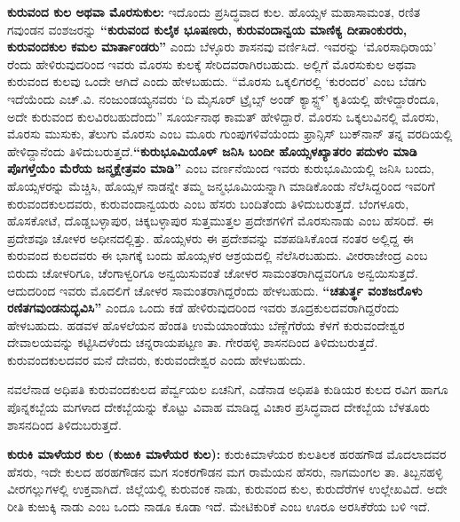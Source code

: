 \textbf{ಕುರುವಂದ ಕುಲ ಅಥವಾ ಮೊರಸುಕುಲ:} ಇದೊಂದು ಪ್ರಸಿದ್ಧವಾದ ಕುಲ. ಹೊಯ್ಸಳ ಮಹಾಸಾಮಂತ, ರಣಿತ ಗವುಂಡನ ವಂಶಜರನ್ನು \textbf{“ಕುರುವಂದ ಕುಲೈಕ ಭೂಷಣರು, ಕುರುವಂದಾನ್ವಯ ಮಾಣಿಕ್ಯ ದೀಪಾಂಕುರರು, ಕುರುವಂದಕುಲ ಕಮಲ ಮಾರ್ತಾಂಡರು”} ಎಂದು ಬೆಳ್ಳೂರು ಶಾಸನವು ವರ್ಣಿಸಿದೆ. ಇವರನ್ನು ‘ಮೊರಸಾಧಿರಾಯ’ ರೆಂದು ಹೇಳಿರುವುದರಿಂದ ಇವರು ಮೊರಸು ಕುಲಕ್ಕೆ ಸೇರಿದವರಾಗಿರಬಹುದು. ಅಲ್ಲಿಗೆ ಮೊರಸುಕುಲ ಅಥವಾ ಕುರುವಂದ ಕುಲವು ಒಂದೇ ಆಗಿದೆ ಎಂದು ಹೇಳಬಹುದು. “ಮೊರಸು ಒಕ್ಕಲಿಗರಲ್ಲಿ ‘ಕುರಂದರ’ ಎಂಬ ಬೆಡಗು ಇದೆಯೆಂದು ಎಚ್​.ವಿ. ನಂಜುಂಡಯ್ಯನವರು ‘ದಿ ಮೈಸೂರ್​ ಟ್ರೈಬ್ಸ್​ ಅಂಡ್​ ಕ್ಯಾಸ್ಟ್ಸ್’ ಕೃತಿಯಲ್ಲಿ ಹೇಳಿದ್ದಾರೆಂದೂ, ಅದೇ ಕುರುವಂದ ಕುಲವಿರಬಹುದೆಂದು” ಸೂರ್ಯನಾಥ ಕಾಮತ್​ ಹೇಳಿದ್ದಾರೆ. ಮೊರಸು ಒಕ್ಕಲುವಿನಲ್ಲಿ ಮೊರಸು, ಮೊರಸು ಮುಸುಕು, ತೆಲುಗು ಮೊರಸು ಎಂಬ ಮೂರು ಗುಂಪುಗಳಿವೆಯೆಂದು ಫ್ರಾನ್ಸಿಸ್​ ಬುಕ್​ನಾನ್​ ತನ್ನ ವರದಿಯಲ್ಲಿ ಹೇಳಿದ್ದಾನೆಂದು ತಿಳಿದುಬರುತ್ತದೆ.\textbf{“ಕುರುಭೂಮಿಯೊಳ್​ ಜನಿಸಿ ಬಂದೀ ಹೊಯ್ಸಳಖ್ಯಾತರಂ ಪದುಳಂ ಮಾಡಿ ಪೊಗಳ್ತೆಯೆಂ ಮೆರೆಯ ಜನ್ಮಕ್ಷೇತ್ರವಂ ಮಾಡಿ”} ಎಂಬ ವರ್ಣನೆಯಿಂದ ಇವರು ಕುರುಭೂಮಿಯಲ್ಲಿ ಜನಿಸಿ ಬಂದು, ಹೊಯ್ಸಳರನ್ನು ಮೆಚ್ಚಿಸಿ, ಹೊಯ್ಸಳ ನಾಡನ್ನೇ ತಮ್ಮ ಜನ್ಮಭೂಮಿಯನ್ನಾಗಿ ಮಾಡಿಕೊಂಡು ನೆಲೆಸಿದ್ದರಿಂದ ಇವರಿಗೆ ಕುರುವಂದಕುಲದವರು, ಕುರುವಂದಾನ್ವಯರು ಎಂಬ ಹೆಸರು ಬಂದಿತೆಂದು ತಿಳಿದುಬರುತ್ತದೆ. ಬೆಂಗಳೂರು, ಹೊಸಕೋಟೆ, ದೊಡ್ಡಬಳ್ಳಾಪುರ, ಚಿಕ್ಕಬಳ್ಳಾಪುರ ಸುತ್ತಮುತ್ತಲ ಪ್ರದೇಶಗಳಿಗೆ ಮೊರಸುನಾಡು ಎಂಬ ಹೆಸರಿದೆ. ಈ ಪ್ರದೇಶವೂ ಚೋಳರ ಅಧೀನದಲ್ಲಿತ್ತು. ಹೊಯ್ಸಳರು ಈ ಪ್ರದೇಶವನ್ನು ವಶಪಡಿಸಿಕೊಂಡ ನಂತರ ಅಲ್ಲಿದ್ದ ಈ ಕುರುವಂದ ಕುಲದವರು ಈ ಭಾಗಕ್ಕೆ ಬಂದು ಹೊಯ್ಸಳರ ಆಶ್ರಯದಲ್ಲಿ ನೆಲೆಸಿರಬಹುದು. ವೀರರಾಜೇಂದ್ರ ಎಂಬ ಬಿರುದು ಚೋಳರಿಗೂ, ಚೆಂಗಾಳ್ವರಿಗೂ ಅನ್ವಯಿಸುವಂತೆ ಚೋಳರ ಸಾಮಂತರಾಗಿದ್ದವರಿಗೂ ಅನ್ವಯಿಸುತ್ತದೆ. ಆದುದರಿಂದ ಇವರು ಮೊದಲಿಗೆ ಚೋಳರ ಸಾಮಂತರಾಗಿದ್ದರೆಂದು ಹೇಳಬಹುದು. \textbf{“ಚತುರ್ತ್ಥ ವಂಶಜರೊಳು ರಣಿತಗವುಂಡನುದ್ಭವಿಸಿ”} ಎಂದೂ ಒಂದು ಕಡೆ ಹೇಳಿರುವುದರಿಂದ ಇವರು ಶೂದ್ರಕುಲದವರಾಗಿದ್ದರೆಂದು ಹೇಳಬಹುದು. ಹಡವಳ ಹೊಳಲೆಯನ ಹೆಂಡತಿ ಉಮೆಯಾಂಡೆಯು ಬೆಣ್ಣೆಗೆರೆಯ ಕೆಳಗೆ ಕುರುವಂದೇಶ್ವರ ದೇವಾಲಯವನ್ನು ಕಟ್ಟಿಸಿದಳೆಂದು ಚನ್ನರಾಯಪಟ್ಟಣ ತಾ. ಗೇರಹಳ್ಳಿ ಶಾಸನದಿಂದ ತಿಳಿದುಬರುತ್ತದೆ. ಕುರುವಂದಕುಲದವರ ಮನೆ ದೇವರು, ಕುರುವಂದೇಶ್ವರ ಎಂದು ಹೇಳಬಹುದು.

\vskip 3pt

ನವಲೆನಾಡ ಅಧಿಪತಿ ಕುರುವಂದಕುಲದ ಪೆರ್ವ್ವಯಲ ಏಚನಿಗೆ, ಎಡೆನಾಡ ಅಧಿಪತಿ ಕುಡಿಯರ ಕುಲದ ರವಿಗ ಹಾಗೂ ಪೊನ್ನಕಬ್ಬೆಯ ಮಗಳಾದ ದೇಕಬ್ಬೆಯನ್ನು ಕೊಟ್ಟು ವಿವಾಹ ಮಾಡಿದ್ದ ವಿಚಾರ ಪ್ರಸಿದ್ಧವಾದ ದೇಕಬ್ಬೆಯ ಬೆಳತೂರು ಶಾಸನದಿಂದ ತಿಳಿದುಬರುತ್ತದೆ.

\vskip 3pt

\textbf{ಕುರುಕಿ ಮಾಳೆಯರ ಕುಲ (ಕುಱುಕಿ ಮಾಳೆಯರ ಕುಲ):} ಕುರುಕಿಮಾಳೆಯರ ಕುಲತಿಲಕ ಹರಹಗೌಡ ಮೊದಲಾದವರ ಹೆಸರು, ಇದೇ ಕುಲದ ಹರಹಗೌಡನ ಮಗ ಸಂಕರಗೌಡನ ಮಗ ರಾಮೆಯನ ಹೆಸರು, ನಾಗಮಂಗಲ ತಾ. ತಿಬ್ಬನಹಳ್ಳಿ ವೀರಗಲ್ಲುಗಳಲ್ಲಿ ಉಕ್ತವಾಗಿದೆ. ಜಿಲ್ಲೆಯಲ್ಲಿ ಕುರುವಂಕ ನಾಡು, ಕುರುವಂದ ಕುಲ, ಕುರುದೆರೆಗಳ ಉಲ್ಲೇಖವಿದೆ. ಅದೇ ರೀತಿ ಕುಱುಕ್ಕಿ ನಾಡು ಎಂಬ ಒಂದು ನಾಡೂ ಕೂಡಾ ಇದೆ. ಮೇಟಿಕುರಿಕೆ ಎಂಬ ಊರೂ ಅರಸಿಕೆರೆಯ ಬಳಿ ಇದೆ.

